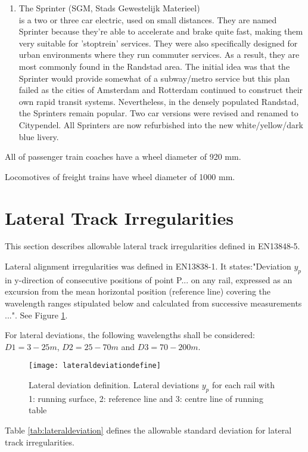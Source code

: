 \begin{enumerate}
    \item The Sprinter (SGM, Stads Gewestelijk Materieel) \\ is a two or three car electric, used on small distances. They are named Sprinter because they're able to accelerate and brake quite fast, making them very suitable for 'stoptrein' services. They were also specifically designed for urban environments where they run commuter services. As a result, they are most commonly found in the Randstad area. The initial idea was that the Sprinter would provide somewhat of a subway/metro service but this plan failed as the cities of Amsterdam and Rotterdam continued to construct their own rapid transit systems. Nevertheless, in the densely populated Randstad, the Sprinters remain popular. Two car versions were revised and renamed to Citypendel. All Sprinters are now refurbished into the new white/yellow/dark blue livery.
\end{enumerate}

All of passenger train coaches have a wheel diameter of 920 mm. 

Locomotives of freight trains have wheel diameter of 1000 mm.

\section{Lateral Track Irregularities}
This section describes allowable lateral track irregularities defined in EN13848-5\cite{13848}. 

Lateral alignment irregularities was defined in EN13838-1. It states:"Deviation $y_p$ in y-direction of consecutive positions of point P... on any rail, expressed as an excursion from the mean horizontal position (reference line) covering the wavelength ranges stipulated below and calculated from successive measurements ...". See Figure \ref{fig:lateraldeviationdefine}.

For lateral deviations, the following wavelengths shall be considered: $D1 = 3 -25 m$, $D2 = 25 - 70 m$ and $D3 = 70 - 200 m$. 

\begin{figure}[h]
    \centering
    \texttt{[image: lateraldeviationdefine]}
    \caption{Lateral deviation definition. Lateral deviations $y_p$ for each rail with 1: running surface, 2: reference line and 3: centre line of running table}
    \label{fig:lateraldeviationdefine}
\end{figure}

Table \ref{tab:lateraldeviation} defines the allowable standard deviation for lateral track irregularities.

